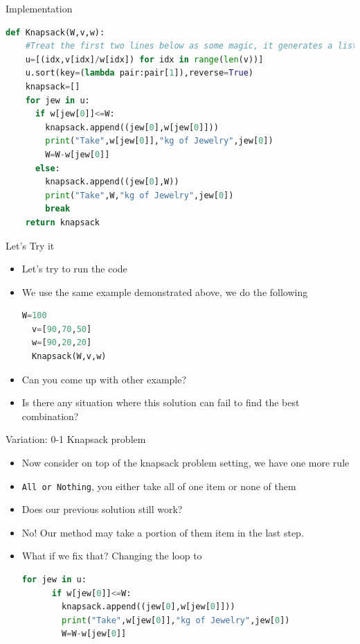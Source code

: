 \documentclass[10pt,xcolor={table,dvipsnames},t]{beamer}
\begin{document}
\begin{frame}[fragile]{Implementation}
\begin{lstlisting}[language=python]
  def Knapsack(W,v,w):
    #Treat the first two lines below as some magic, it generates a list u, each element in u is a pair with the the index and the unit price, then u is sorted in descending order
    u=[(idx,v[idx]/w[idx]) for idx in range(len(v))]
    u.sort(key=(lambda pair:pair[1]),reverse=True)
    knapsack=[]
    for jew in u:
      if w[jew[0]]<=W:
        knapsack.append((jew[0],w[jew[0]]))
        print("Take",w[jew[0]],"kg of Jewelry",jew[0])
        W=W-w[jew[0]]
      else:
        knapsack.append((jew[0],W))
        print("Take",W,"kg of Jewelry",jew[0])
        break
    return knapsack
\end{lstlisting}
\end{frame}

\begin{frame}[fragile]{Let's Try it}
  \begin{itemize}
    \item Let's try to run the code
    \item We use the same example demonstrated above, we do the following
\begin{lstlisting}[language=python]
  W=100
  v=[90,70,50]
  w=[90,20,20]
  Knapsack(W,v,w)
\end{lstlisting}
    \item Can you come up with other example?
    \item Is there any situation where this solution can fail to find the best combination?
  \end{itemize}  
\end{frame}

\begin{frame}[fragile]{Variation: 0-1 Knapsack problem}
  \begin{itemize}
    \item Now consider on top of the knapsack problem setting, we have one more rule
    \item \texttt{All or Nothing}, you either take all of one item or none of them
    \item Does our previous solution still work?
    \item No! Our method may take a portion of them item in the last step.
    \item What if we fix that? Changing the loop to 
\begin{lstlisting}[language=python]
  for jew in u:
      if w[jew[0]]<=W:
        knapsack.append((jew[0],w[jew[0]]))
        print("Take",w[jew[0]],"kg of Jewelry",jew[0])
        W=W-w[jew[0]]
\end{lstlisting}
  \end{itemize}
\end{frame}
\end{document}
